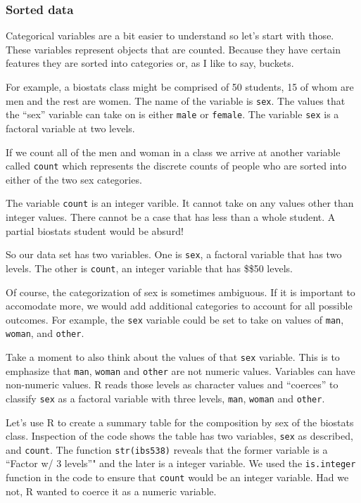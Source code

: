 \documentclass[]{book}
\begin{document}
\hypertarget{sorted-data}{%
\subsubsection{Sorted data}\label{sorted-data}}

Categorical variables are a bit easier to understand so let's start with those. These variables represent objects that are counted. Because they have certain features they are sorted into categories or, as I like to say, buckets.

For example, a biostats class might be comprised of 50 students, 15 of whom are men and the rest are women. The name of the variable is \texttt{sex}. The values that the ``sex'' variable can take on is either \texttt{male} or \texttt{female}. The variable \texttt{sex} is a factoral variable at two levels.

If we count all of the men and woman in a class we arrive at another variable called \texttt{count} which represents the discrete counts of people who are sorted into either of the two sex categories.

The variable \texttt{count} is an integer varible. It cannot take on any values other than integer values. There cannot be a case that has less than a whole student. A partial biostats student would be absurd!

So our data set has two variables. One is \texttt{sex}, a factoral variable that has two levels. The other is \texttt{count}, an integer variable that has \$\le\$50 levels.

Of course, the categorization of sex is sometimes ambiguous. If it is important to accomodate more, we would add additional categories to account for all possible outcomes. For example, the \texttt{sex} variable could be set to take on values of \texttt{man}, \texttt{woman}, and \texttt{other}.

Take a moment to also think about the values of that \texttt{sex} variable. This is to emphasize that \texttt{man}, \texttt{woman} and \texttt{other} are not numeric values. Variables can have non-numeric values. R reads those levels as character values and ``coerces'' to classify \texttt{sex} as a factoral variable with three levels, \texttt{man}, \texttt{woman} and \texttt{other}.

Let's use R to create a summary table for the composition by sex of the biostats class. Inspection of the code shows the table has two variables, \texttt{sex} as described, and \texttt{count}. The function \texttt{str(ibs538)} reveals that the former variable is a ``Factor w/ 3 levels''" and the later is a integer variable. We used the \texttt{is.integer} function in the code to ensure that \texttt{count} would be an integer variable. Had we not, R wanted to coerce it as a numeric variable.
\end{document}
